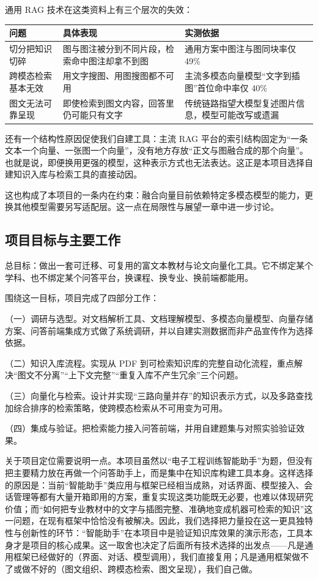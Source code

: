 \documentclass[12pt,a4paper]{ctexart}
\begin{document}
通用 RAG 技术在这类资料上有三个层次的失效：

\begin{table}[H]
\centering
\small
\begin{tabular}{@{}p{3.1cm}p{6.0cm}p{4.4cm}@{}}
\toprule
\textbf{问题} & \textbf{具体表现} & \textbf{实测依据} \\
\midrule
切分把知识切碎 & 图与图注被分到不同片段，检索命中图注却拿不到图 & 通用方案中图注与图同块率仅 49\% \\
\addlinespace
跨模态检索基本无效 & 用文字搜图、用图搜图都不可用 & 主流多模态向量模型“文字到插图”首位命中率仅 40\% \\
\addlinespace
图文无法可靠呈现 & 即使检索到图文内容，回答里仍可能只有文字 & 传统链路指望大模型复述图片信息，模型可能改写或遗漏 \\
\bottomrule
\end{tabular}
\end{table}

还有一个结构性原因促使我们自建工具：主流 RAG 平台的索引结构固定为“一条文本一个向量、一张图一个向量”，没有地方存放“正文与图融合成的那个向量”。也就是说，即便换用更强的模型，这种表示方式也无法表达。这正是本项目选择自建知识入库与检索工具的直接动因。

这也构成了本项目的一条内在约束：融合向量目前依赖特定多模态模型的能力，更换其他模型需要另写适配层。这一点在局限性与展望一章中进一步讨论。

\subsection{项目目标与主要工作}

总目标：做出一套可迁移、可复用的富文本教材与论文向量化工具。它不绑定某个学科、也不绑定某个问答平台，换课程、换专业、换前端都能用。

围绕这一目标，项目完成了四部分工作：

（一）调研与选型。对文档解析工具、文档理解模型、多模态向量模型、向量存储方案、问答前端集成方式做了系统调研，并以自建实测数据而非产品宣传作为选择依据。

（二）知识入库流程。实现从 PDF 到可检索知识库的完整自动化流程，重点解决“图文不分离”“上下文完整”“重复入库不产生冗余”三个问题。

（三）向量化与检索。设计并实现“三路向量并存”的知识表示方式，以及多路查找加综合排序的检索策略，使跨模态检索从不可用变为可用。

（四）集成与验证。把检索能力接入问答前端，并用自建题集与对照实验验证效果。

关于项目定位需要说明一点。本项目虽然以“电子工程训练智能助手”为题，但没有把主要精力放在再做一个问答助手上，而是集中在知识库构建工具本身。这样选择的原因是：当前“智能助手”类应用与框架已经相当成熟，对话界面、模型接入、会话管理等都有大量开箱即用的方案，重复实现这类功能既无必要，也难以体现研究价值；而“如何把专业教材中的文字与插图完整、准确地变成机器可检索的知识”这一问题，在现有框架中恰恰没有被解决。因此，我们选择把力量投在这一更具独特性与创新性的环节：“智能助手”在本项目中是验证知识库效果的演示形态，工具本身才是项目的核心成果。这一取舍也决定了后面所有技术选择的出发点——凡是通用框架已经做好的（界面、对话、模型调用），我们直接复用；凡是通用框架做不了或做不好的（图文组织、跨模态检索、图文呈现），我们自己做。
\end{document}
